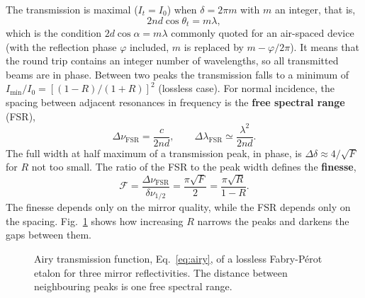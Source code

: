 \documentclass[11pt,a4paper]{article}
\newcommand{\FP}{Fabry-P\'erot}
\newcommand{\FSR}{\Delta\nu_{\mathrm{FSR}}}
\newcommand{\Fin}{\mathcal{F}}
\begin{document}
	The transmission is maximal ($I_t=I_0$) when $\delta=2\pi m$ with $m$ an integer, that is,
	\begin{equation}
		2nd\cos\theta_t = m\lambda ,
		\label{eq:resonance}
	\end{equation}
	which is the condition $2d\cos\alpha=m\lambda$ commonly quoted for an air-spaced device (with the reflection phase $\varphi$ included, $m$ is replaced by $m-\varphi/2\pi$). It means that the round trip contains an integer number of wavelengths, so all transmitted beams are in phase. Between two peaks the transmission falls to a minimum of $I_{\min}/I_0=[(1-R)/(1+R)]^2$ (lossless case). For normal incidence, the spacing between adjacent resonances in frequency is the \textbf{free spectral range} (FSR),
	\begin{equation}
		\FSR = \frac{c}{2nd}, \qquad \Delta\lambda_{\mathrm{FSR}}\simeq\frac{\lambda^2}{2nd}.
		\label{eq:fsr}
	\end{equation}
	The full width at half maximum of a transmission peak, in phase, is $\Delta\delta\approx 4/\sqrt F$ for $R$ not too small. The ratio of the FSR to the peak width defines the \textbf{finesse},
	\begin{equation}
		\Fin = \frac{\FSR}{\delta\nu_{1/2}} = \frac{\pi\sqrt F}{2} = \frac{\pi\sqrt R}{1-R}.
		\label{eq:finesse}
	\end{equation}
	The finesse depends only on the mirror quality, while the FSR depends only on the spacing. Fig.~\ref{fig:airy} shows how increasing $R$ narrows the peaks and darkens the gaps between them.
	
	\begin{figure}[ht]
		\centering
		\caption{Airy transmission function, Eq.~\eqref{eq:airy}, of a lossless \FP{} etalon for three mirror reflectivities. The distance between neighbouring peaks is one free spectral range.}
		\label{fig:airy}
	\end{figure}
	
\end{document}
